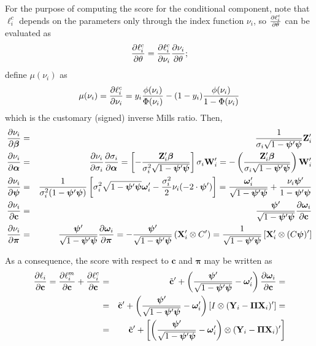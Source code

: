 \documentclass[a4paper,10pt]{article}
\newcommand{\pder}[2]{\ensuremath\frac{\partial #1}{\partial #2}}
\newcommand{\Depvar}{y_{i}}
\newcommand{\Endog}{\mathbf{Y}_{i}}
\newcommand{\Expla}{\mathbf{Z}_{i}}
\newcommand{\ExoInst}{\mathbf{X}_{i}}
\newcommand{\CSReg}{\mathbf{W}_{i}}
\newcommand{\ScRfDist}{\bm{\omega}_i}
\newcommand{\ProbitPar}{\bm{\beta}}
\newcommand{\RfPar}{\bm{\Pi}}
\newcommand{\vRfPar}{\bm{\pi}}
\newcommand{\VarPar}{\bm{\alpha}}
\newcommand{\CondSig}{\sigma_i}
\newcommand{\ScCov}{\bm{\psi}}
\newcommand{\vechC}{\mathbf{c}}
\begin{document}
For the purpose of computing the score for the conditional component,
note that $\ell^c_i$ depends on the parameters only through the index
function $\nu_i$, so $\pder{\ell^c_i}{\theta}$ can be evaluated as
\[
\pder{\ell^c_i}{\theta} = \pder{\ell^c_i}{\nu_i}\pder{\nu_i}{\theta} ;
\]
define $\mu(\nu_i)$ as
\[
\mu(\nu_i) = \pder{\ell^c_i}{\nu_i} = \Depvar
\frac{\phi(\nu_i)}{\Phi(\nu_i)} - (1-\Depvar)\frac{\phi(\nu_i)}{1
  -\Phi(\nu_i)}
\]
which is the customary (signed) inverse Mills ratio. Then,
\begin{eqnarray*}
  \pder{\nu_i}{\ProbitPar} & = & \frac{1}{\CondSig \sqrt{1- \ScCov'
      \ScCov}} \Expla' \\
  \pder{\nu_i}{\VarPar} & = & \pder{\nu_i}{\CondSig}
  \pder{\CondSig}{\VarPar} =
  \left[- \frac{\Expla'\ProbitPar}
    {\CondSig^2 \sqrt{1- \ScCov' \ScCov}} \right] \CondSig \CSReg' =
  - \left( \frac{\Expla'\ProbitPar}
    {\CondSig \sqrt{1- \ScCov' \ScCov}}\right)  \CSReg' \\
  \pder{\nu_i}{\ScCov} & = &
  \frac{1}{\CondSig^2 (1- \ScCov' \ScCov)}
  \left[ 
    \CondSig^2 \sqrt{1- \ScCov' \ScCov} \ScRfDist' - 
    \frac{\CondSig^2}{2} \nu_i (-2 \cdot \ScCov')
  \right] =
  \frac{ \ScRfDist'}{\sqrt{1- \ScCov' \ScCov}} +
  \frac{\nu_i \ScCov'}{1- \ScCov' \ScCov} \\
  \pder{\nu_i}{\vechC} & = & \frac{\ScCov'}{\sqrt{1- \ScCov'
      \ScCov}} \pder{\ScRfDist}{\vechC} \\
  \pder{\nu_i}{\vRfPar} & = &\frac{\ScCov'}{\sqrt{1- \ScCov'
      \ScCov}} \pder{\ScRfDist}{\vRfPar} = 
      - \frac{\ScCov'}{\sqrt{1- \ScCov' \ScCov}} \left( \ExoInst'
        \otimes C' \right) = 
      \frac{1}{\sqrt{1- \ScCov'\ScCov}} \left[ \ExoInst' \otimes (C\ScCov)' \right]
\end{eqnarray*}

As a consequence, the score with respect to $\vechC$ and $\vRfPar$ may
be written as
\begin{eqnarray*}
  \pder{\ell_i}{\vechC} = \pder{\ell^m_i}{\vechC} +
  \pder{\ell^c_i}{\vechC} &=&
  \tilde{\mathbf{c}}' +
  \left( \frac{\ScCov'}{\sqrt{1- \ScCov'\ScCov}} - \ScRfDist'\right)
  \pder{\ScRfDist}{\vechC} = \\
  & = & \tilde{\mathbf{c}}' +
  \left( \frac{\ScCov'}{\sqrt{1- \ScCov'\ScCov}} - \ScRfDist'\right)
  \left[I \otimes (\Endog - \RfPar \ExoInst)' \right] = \\
  & = & \tilde{\mathbf{c}}' +
  \left[
    \left( \frac{\ScCov'}{\sqrt{1- \ScCov'\ScCov}} - \ScRfDist'\right)
    \otimes (\Endog - \RfPar \ExoInst)' 
  \right] \\
\end{eqnarray*}
\end{document}

